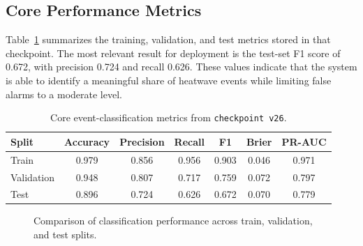 \documentclass[12pt,a4paper]{article}
\begin{document}
\subsection{Core Performance Metrics}
Table~\ref{tab:metrics} summarizes the training, validation, and test metrics stored in that checkpoint. The most relevant result for deployment is the test-set F1 score of 0.672, with precision 0.724 and recall 0.626. These values indicate that the system is able to identify a meaningful share of heatwave events while limiting false alarms to a moderate level.

\begin{table}[H]
\centering
\caption{Core event-classification metrics from \texttt{checkpoint v26}.}
\label{tab:metrics}
\begin{tabular}{lcccccc}
\toprule
Split & Accuracy & Precision & Recall & F1 & Brier & PR-AUC \\
\midrule
Train & 0.979 & 0.856 & 0.956 & 0.903 & 0.046 & 0.971 \\
Validation & 0.948 & 0.807 & 0.717 & 0.759 & 0.072 & 0.797 \\
Test & 0.896 & 0.724 & 0.626 & 0.672 & 0.070 & 0.779 \\
\bottomrule
\end{tabular}
\end{table}

\begin{figure}[H]
\centering
{}
\caption{Comparison of classification performance across train, validation, and test splits.}
\label{fig:split-metrics}
\end{figure}
\end{document}

